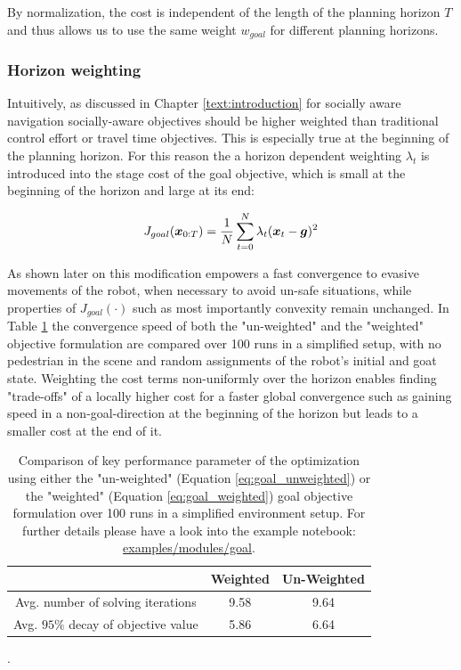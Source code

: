 By normalization, the cost is independent of the length of the planning horizon $T$ and thus allows us to use the same weight $w_{goal}$ for different planning horizons.

\subsubsection{Horizon weighting}
Intuitively, as discussed in Chapter \ref{text:introduction} for socially aware navigation socially-aware objectives should be higher weighted than traditional control effort or travel time objectives. This is especially true at the beginning of the planning horizon. For this reason the a horizon dependent weighting $\lambda_t$ is introduced into the stage cost of the goal objective, which is small at the beginning of the horizon and large at its end: 

\begin{equation}
J_{goal}(\boldsymbol{x}_{0:T}) = \frac{1}{N} \sum_{t = 0}^N \lambda_t (\boldsymbol{x}_t - \boldsymbol{g})^2
\label{eq:goal_weighted}
\end{equation}

As shown later on this modification empowers a fast convergence to evasive movements of the robot, when necessary to avoid un-safe situations, while properties of $J_{goal}(\cdot)$ such as most importantly convexity remain unchanged. In Table \ref{table:goal_horizon_weighting} the convergence speed of both the "un-weighted" and the "weighted" objective formulation are compared over 100 runs in a simplified setup, with no pedestrian in the scene and random assignments of the robot's initial and goat state. Weighting the cost terms non-uniformly over the horizon enables finding "trade-offs" of a locally higher cost for a faster global convergence such as gaining speed in a non-goal-direction at the beginning of the horizon but leads to a smaller cost at the end of it. 

\begin{table}[!ht]
\begin{center}
\begin{tabular}{c|c|c}
 & Weighted & Un-Weighted \\
\hline
Avg. number of solving iterations & 9.58 & 9.64 \\
\hline
Avg. $95 \%$ decay of objective value & 5.86 & 6.64 \\
\end{tabular}
\caption{Comparison of key performance parameter of the optimization using either the "un-weighted" (Equation \ref{eq:goal_unweighted}) or the "weighted" (Equation  \ref{eq:goal_weighted}) goal objective formulation over 100 runs in a simplified environment setup. For further details please have a look into the example notebook: \href{https://github.com/simon-schaefer/mantrap/blob/master/examples/modules/goal.ipynb}{examples/modules/goal}.}.
\label{table:goal_horizon_weighting}
\end{center}
\end{table}


